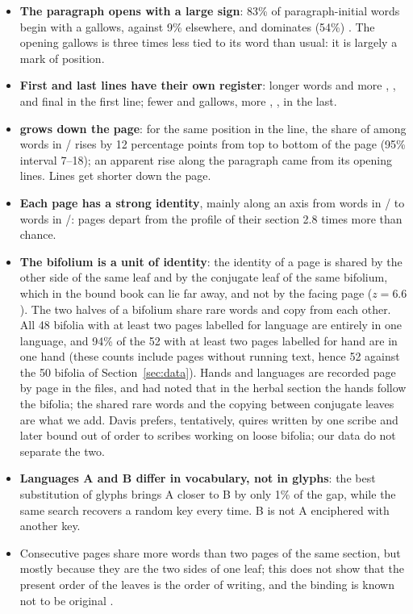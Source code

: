 \begin{itemize}
\item \textbf{The paragraph opens with a large sign}: 83\% of paragraph-initial words begin with a gallows, against 9\%
  elsewhere, and  dominates (54\%) \citep{currier1976,dimperio1978,stafford2022,feaster2022}. The opening gallows
  is three times less tied to its word than usual: it is largely a mark of position.
\item \textbf{First and last lines have their own register}: longer words and more , ,  and final
   in the first line; fewer  and gallows, more , ,  in the last.
\item \textbf{ grows down the page}: for the same position in the line, the share of  among words in
  / rises by 12 percentage points from top to bottom of the page (95\% interval 7--18); an apparent rise along
  the paragraph came from its opening lines. Lines get shorter down the page.
\item \textbf{Each page has a strong identity}, mainly along an axis from words in / to words in
  /: pages depart from the profile of their section 2.8 times more than chance.
\item \textbf{The bifolium is a unit of identity}: the identity of a page is shared by the other side of the same leaf and
  by the conjugate leaf of the same bifolium, which in the bound book can lie far away, and not by the facing page
  ($z = 6.6$). The two halves of a bifolium share rare words and copy from each other. All 48 bifolia with at least two
  pages labelled for language are entirely in one language, and 94\% of the 52 with at least two pages labelled for
  hand are in one hand (these counts include pages without running text, hence 52 against the 50 bifolia of
Section~\ref{sec:data}). Hands and languages are recorded page by page in the files, and
  \citet{davis2025} had noted that in the herbal section the hands follow the bifolia; the shared rare words and the
  copying between conjugate leaves are what we add. Davis prefers, tentatively, quires written by one scribe and later
  bound out of order to scribes working on loose bifolia; our data do not separate the two.
\item \textbf{Languages A and B differ in vocabulary, not in glyphs}: the best substitution of glyphs brings A closer to B
  by only 1\% of the gap, while the same search recovers a random key every time. B is not A enciphered with another key.
\item Consecutive pages share more words than two pages of the same section, but mostly because they are the two sides of
  one leaf; this does not show that the present order of the leaves is the order of writing, and the binding is known not
  to be original \citep{davis2025}.
\end{itemize}
